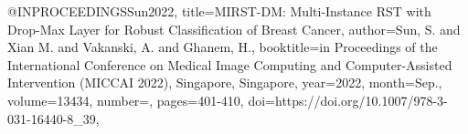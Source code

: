 @INPROCEEDINGS{Sun2022,
title={MIRST-DM: Multi-Instance RST with Drop-Max Layer for Robust Classification of Breast Cancer},
author={Sun, S. and Xian M. and Vakanski, A. and Ghanem, H.},
booktitle={in Proceedings of the International Conference on Medical Image Computing and Computer-Assisted Intervention (MICCAI 2022), Singapore, Singapore},
year={2022},
month={Sep.},
volume={13434},
number={},
pages={401-410},
doi={https://doi.org/10.1007/978-3-031-16440-8_39}, } 